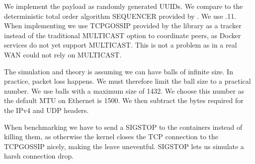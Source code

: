 We implement the payload as randomly generated UUIDs. We compare \epto to the deterministic total order algorithm SEQUENCER provided by \jgroups. We use .11. When implementing \jgroups we use TCPGOSSIP \autocite{tcpgossip} provided by the \jgroups library as a tracker instead of the traditional MULTICAST option to coordinate peers, as Docker services do not yet support MULTICAST. This is not a problem as in a real WAN \jgroups could not rely on MULTICAST.

The \epto simulation and theory is assuming we can have balls of infinite size. In practice, packet loss happens. We must therefore limit the ball size to a practical number. We use balls with a maximum size of \SI{1432}{\byte}. We choose this number as the default MTU on Ethernet is \SI{1500}{\byte}. We then subtract the bytes required for the IPv4 and UDP headers.

When benchmarking \jgroups we have to send a SIGSTOP to the containers instead of killing them, as otherwise the kernel closes the TCP connection to the TCPGOSSIP nicely, making the leave uneventful. SIGSTOP lets us simulate a harsh connection drop.